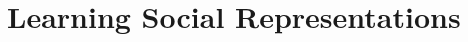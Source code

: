 \documentclass{sig-alternate}
\begin{document}









\section{Learning Social Representations}
\label{sec:SRL}

\end{document}

